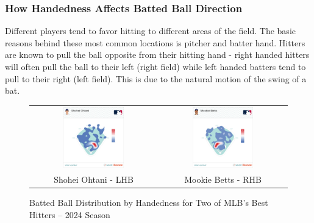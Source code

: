 \documentclass{article}
\begin{document}
\subsubsection{How Handedness Affects Batted Ball Direction}
Different players tend to favor hitting to different areas of the field. The basic reasons behind these most common locations is pitcher and batter hand. Hitters are known to pull the ball opposite from their hitting hand - right handed hitters will often pull the ball to their left (right field) while left handed batters tend to pull to their right (left field). This is due to the natural motion of the swing of a bat. 

\begin{figure}[h]
    \centering
    \begin{tabular}{cc}  
        \includegraphics[width=0.5\textwidth]{images/OhtaniHeat.jpg} & 
        \includegraphics[width=0.5\textwidth]{images/BettsHeat.jpg} \\
        Shohei Ohtani - LHB & Mookie Betts - RHB
    \end{tabular}
    \caption{Batted Ball Distribution by Handedness for Two of MLB's Best Hitters – 2024 Season}
    \label{fig:heatmaps}
\end{figure}
\vspace{1.5cm}
\end{document}
